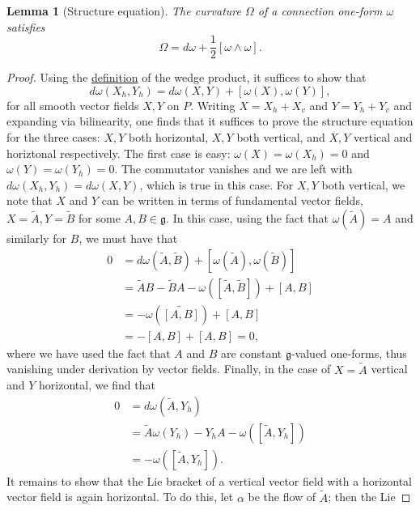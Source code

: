 \documentclass{book}
\newcommand{\fr}{\mathfrak}
\theoremstyle{plain}
\newtheorem{lem}[thm]{Lemma}
\theoremstyle{definition}
\theoremstyle{remark}
\begin{document}
\begin{lem}[Structure equation]
    \label{lem:curvature_structure}
    The curvature $\Omega$ of a connection one-form $\omega$ satisfies 
    \begin{equation}
        \Omega=d\omega + \frac{1}{2}[\omega\wedge\omega].
        \label{eq:curvature_structure}
    \end{equation}
\end{lem}
\begin{proof}
    Using the \hyperref[defn:wedge]{definition} of the wedge product, it suffices to show that
    \[d\omega(X_h,Y_h)=d\omega(X,Y)+[\omega(X),\omega(Y)],\]
    for all smooth vector fields $X,Y$ on $P$. Writing $X=X_h+X_v$ and $Y=Y_h+Y_v$ and expanding
    via bilinearity, one finds that it suffices to prove the structure equation for the three cases:
    $X,Y$ both horizontal, $X,Y$ both vertical, and $X,Y$ vertical and horiztonal respectively.
    The first case is easy: $\omega(X)=\omega(X_h)=0$ and $\omega(Y)=\omega(Y_h)=0$. The commutator vanishes
    and we are left with $d\omega(X_h,Y_h)=d\omega(X,Y)$, which is true in this case. For $X,Y$ both
    vertical, we note that $X$ and $Y$ can be written in terms of fundamental vector fields, $X=\tilde A,Y=\tilde B$
    for some $A,B\in\fr g$. In this case, using the fact that $\omega(\tilde A)=A$ and similarly for $B$, we must have that
    \begin{align*}
        0&=d\omega(\tilde A,\tilde B)+[\omega(\tilde A),\omega(\tilde B)]\\
        &=\tilde AB-\tilde BA-\omega\left([\tilde A,\tilde B]\right)+[A,B]\\
        &=-\omega\left(\widetilde{[A,B]}\right)+[A,B]\\
        &=-[A,B]+[A,B]=0,
    \end{align*}
    where we have used the fact that $A$ and $B$ are constant $\fr g$-valued one-forms, thus vanishing under
    derivation by vector fields. Finally, in the case of $X=\tilde A$ vertical and $Y$ horizontal, we find that
    \begin{align*}
        0&=d\omega(\tilde A,Y_h)\\
        &=\tilde A\omega(Y_h)-Y_hA-\omega([\tilde A,Y_h])\\
        &=-\omega([\tilde A,Y_h]).
    \end{align*}
    It remains to show that the Lie bracket of a vertical vector field with a horizontal vector field is again
    horizontal. To do this, let $\alpha$ be the flow of $\tilde A$; then the Lie

\end{proof}
\end{document}
